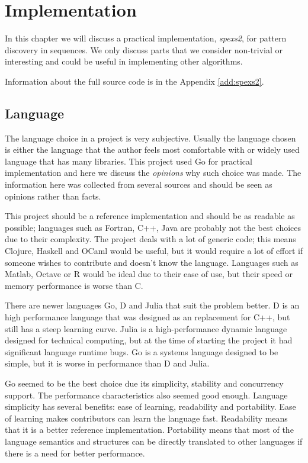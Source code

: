 \chapter{Implementation}
\label{c:implementation}

In this chapter we will discuss a practical implementation, \emph{spexs2}, for pattern discovery in sequences. We only discuss parts that we consider non-trivial or interesting and could be useful in implementing other algorithms.

Information about the full source code is in the Appendix \ref{add:spexs2}.

\section{Language}

The language choice in a project is very subjective. Usually the language chosen is either the language that the author feels most comfortable with or widely used language that has many libraries. This project used Go for practical implementation and here we discuss the \emph{opinions} why such choice was made. The information here was collected from several sources\cite{HammerPrinciple,LanguageShootout,LoopRecognition,go,clojure,julia} and should be seen as opinions rather than facts.

This project should be a reference implementation and should be as readable as possible; languages such as Fortran, C++, Java are probably not the best choices due to their complexity. The project deals with a lot of generic code; this means Clojure, Haskell and OCaml would be useful, but it would require a lot of effort if someone wishes to contribute and doesn't know the language. Languages such as Matlab, Octave or R would be ideal due to their ease of use, but their speed or memory performance is worse than C.

There are newer languages Go, D and Julia that suit the problem better. D is an high performance language that was designed as an replacement for C++, but still has a steep learning curve. Julia is a high-performance dynamic language designed for technical computing, but at the time of starting the project it had significant language runtime bugs. Go is a systems language designed to be simple, but it is worse in performance than D and Julia.

Go seemed to be the best choice due its simplicity, stability and concurrency support. The performance characteristics also seemed good enough. Language simplicity has several benefits: ease of learning, readability and portability. Ease of learning makes contributors can learn the language fast. Readability means that it is a better reference implementation. Portability means that most of the language semantics and structures can be directly translated to other languages if there is a need for better performance.

